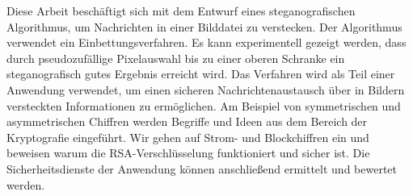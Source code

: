 \newenvironment{abstractpage}
{\cleardoublepage\vspace*{\fill}\thispagestyle{empty}}
{\vfill\cleardoublepage}
\newenvironment{myabstract}[1]
{\bigskip\selectlanguage{#1}
  \begin{center}
    \bfseries\abstractname
  \end{center}}
{\par\bigskip}

\begin{abstractpage}
  \begin{myabstract}{german}
    Diese Arbeit beschäftigt sich mit dem Entwurf eines steganografischen Algorithmus, um
    Nachrichten in einer Bilddatei zu verstecken.
    Der Algorithmus verwendet ein  Einbettungsverfahren. Es
    kann experimentell gezeigt werden, dass durch pseudozufällige
    Pixelauswahl bis zu einer oberen Schranke ein
    steganografisch gutes Ergebnis erreicht wird.
    Das Verfahren wird als Teil einer Anwendung verwendet,
    um einen sicheren Nachrichtenaustausch über in Bildern versteckten
    Informationen zu ermöglichen. Am Beispiel von
    symmetrischen und asymmetrischen Chiffren werden Begriffe und Ideen
    aus dem Bereich der Kryptografie eingeführt. Wir gehen auf
    Strom- und Blockchiffren ein und beweisen warum die
    RSA-Verschlüsselung funktioniert und sicher ist.
    Die Sicherheitsdienste der Anwendung können anschließend ermittelt
    und bewertet werden.
  \end{myabstract}
  \begin{myabstract}{english}

  \end{myabstract}
\end{abstractpage}